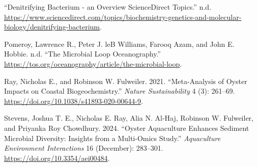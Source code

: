 \documentclass[
  11pt,
]{article}
\newlength{\cslhangindent}
\newenvironment{CSLReferences}[2] %
 {\begin{list}{}{%
  \setlength{\itemindent}{0pt}
  \setlength{\leftmargin}{0pt}
  \setlength{\parsep}{0pt}
  \ifodd #1
   \setlength{\leftmargin}{\cslhangindent}
   \setlength{\itemindent}{-1\cslhangindent}
  \fi
  \setlength{\itemsep}{#2\baselineskip}}}
 {\end{list}}
\begin{document}
\label{refs}
\begin{CSLReferences}{1}{0}
{``Denitrifying Bacterium - an Overview \textbar{} ScienceDirect
Topics.''} n.d.
\url{https://www.sciencedirect.com/topics/biochemistry-genetics-and-molecular-biology/denitrifying-bacterium}.

Pomeroy, Lawrence R., Peter J. leB Williams, Farooq Azam, and John E.
Hobbie. n.d. {``The Microbial Loop \textbar{} Oceanography.''}
\url{https://tos.org/oceanography/article/the-microbial-loop}.

Ray, Nicholas E., and Robinson W. Fulweiler. 2021. {``Meta-Analysis of
Oyster Impacts on Coastal Biogeochemistry.''} \emph{Nature
Sustainability} 4 (3): 261--69.
\url{https://doi.org/10.1038/s41893-020-00644-9}.

Stevens, Joshua T. E., Nicholas E. Ray, Alia N. Al-Haj, Robinson W.
Fulweiler, and Priyanka Roy Chowdhury. 2024. {``Oyster Aquaculture
Enhances Sediment Microbial Diversity: Insights from a Multi-Omics
Study.''} \emph{Aquaculture Environment Interactions} 16 (December):
283--301. \url{https://doi.org/10.3354/aei00484}.

\end{CSLReferences}
\end{document}
